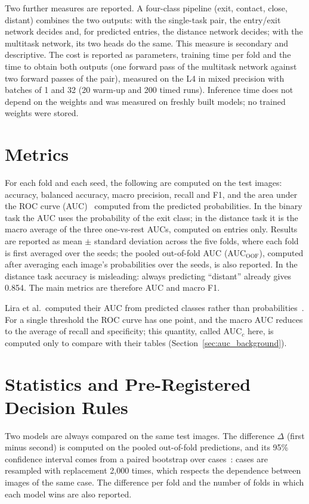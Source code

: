 Two further measures are reported. A four-class pipeline (exit, contact, close, distant) combines the two outputs: with the single-task pair, the entry/exit network decides and, for predicted entries, the distance network decides; with the multitask network, its two heads do the same. This measure is secondary and descriptive. The cost is reported as parameters, training time per fold and the time to obtain both outputs (one forward pass of the multitask network against two forward passes of the pair), measured on the L4 in mixed precision with batches of 1 and 32 (20 warm-up and 200 timed runs). Inference time does not depend on the weights and was measured on freshly built models; no trained weights were stored.

\section{Metrics}
\label{sec:metrics}

For each fold and each seed, the following are computed on the test images: accuracy, balanced accuracy, macro precision, recall and F1, and the area under the ROC curve (AUC)~\cite{fawcett2006roc} computed from the predicted probabilities. In the binary task the AUC uses the probability of the exit class; in the distance task it is the macro average of the three one-vs-rest AUCs, computed on entries only. Results are reported as mean $\pm$ standard deviation across the five folds, where each fold is first averaged over the seeds; the pooled out-of-fold AUC (AUC$_{\mathrm{OOF}}$), computed after averaging each image's probabilities over the seeds, is also reported. In the distance task accuracy is misleading: always predicting ``distant'' already gives 0.854. The main metrics are therefore AUC and macro F1.

Lira et al.\ computed their AUC from predicted classes rather than probabilities~\cite{leguwoi}. For a single threshold the ROC curve has one point, and the macro AUC reduces to the average of recall and specificity; this quantity, called AUC$_c$ here, is computed only to compare with their tables (Section~\ref{sec:auc_background}).

\section{Statistics and Pre-Registered Decision Rules}
\label{sec:stats}

Two models are always compared on the same test images. The difference $\Delta$ (first minus second) is computed on the pooled out-of-fold predictions, and its 95\% confidence interval comes from a paired bootstrap over cases~\cite{efron1993bootstrap}: cases are resampled with replacement 2,000 times, which respects the dependence between images of the same case. The difference per fold and the number of folds in which each model wins are also reported.

